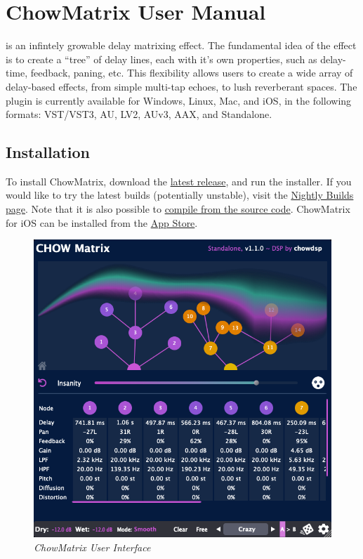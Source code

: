 \documentclass[landscape,twocolumn,a5paper]{manual}
\def\dllink#1{\href{https://chowdsp.com/products.html\#matrix}{#1}}
\begin{document}
\section{ChowMatrix User Manual}

\noindent
{} is an infintely growable delay
matrixing effect. The fundamental idea of the effect is
to create a ``tree'' of delay lines, each with it's own
properties, such as delay-time, feedback, paning, etc.
This flexibility allows users to create a wide array of
delay-based effects, from simple multi-tap echoes, to
lush reverberant spaces. The plugin is currently available
for Windows, Linux, Mac, and iOS, in the following formats:
VST/VST3, AU, LV2, AUv3, AAX, and Standalone.

\subsection{Installation}
To install ChowMatrix, download the \dllink{latest release},
and run the installer. If you would like to try the
latest builds (potentially unstable), visit the
\href{https://chowdsp.com/nightly.html\#matrix}{Nightly Builds page}.
Note that it is also possible to
\href{https://github.com/Chowdhury-DSP/ChowMatrix#Building}{compile from the source code}.
ChowMatrix for iOS can be installed from the
\href{https://apps.apple.com/us/app/chowmatrix/id1598726146}{App Store}.

\begin{figure}[ht]
    \center
    \includegraphics[width=0.75\columnwidth]{screenshots/full_gui.png}
    \caption{\label{fig:full_gui}{\it ChowMatrix User Interface}}
\end{figure}
\end{document}
